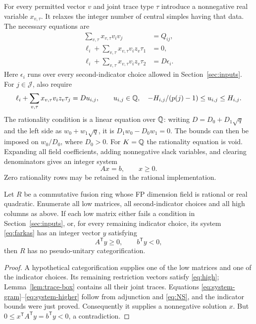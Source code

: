For every permitted vector $v$ and joint trace type $\tau$ introduce a
nonnegative real variable $x_{v,\tau}$. It relaxes the integer number of
central simples having that data. The necessary equations are
\begin{align}
 \sum_{v,\tau}x_{v,\tau}v_iv_j&=Q_{ij},\label{eq:system-gram}\\
 \ell_i+\sum_{v,\tau}x_{v,\tau}v_i z_v\tau_1&=0,
                                                       \label{eq:system-one}\\
 \ell_i+\sum_{v,\tau}x_{v,\tau}v_i z_v\tau_2&=D\epsilon_i.
                                                       \label{eq:system-two}
\end{align}
Here $\epsilon_i$ runs over every second-indicator choice allowed in
Section~\ref{sec:inputs}. For $j\in\mathcal J$, also require
\begin{equation}\label{eq:system-higher}
 \ell_i+\sum_{v,\tau}x_{v,\tau}v_i z_v\tau_j=D u_{i,j},
 \qquad u_{i,j}\in\mathbb Q,\quad
 -H_{i,j}/(p(j)-1)\le u_{i,j}\le H_{i,j}.
\end{equation}
The rationality condition is a linear equation over $\mathbb Q$: writing
$D=D_0+D_1\sqrt q$ and the left side as $w_0+w_1\sqrt q$, it is
$D_1w_0-D_0w_1=0$. The bounds can then be imposed on $w_0/D_0$,
where $D_0>0$. For $K=\mathbb Q$ the rationality equation is void.
Expanding all field coefficients, adding nonnegative slack variables,
and clearing denominators gives an integer system
\begin{equation}\label{eq:farkas}
 A x=b,\qquad x\ge0.
\end{equation}
Zero rationality rows may be retained in the rational implementation.

\begin{theorem}\label{thm:finite}
Let $R$ be a commutative fusion ring whose FP dimension field is rational
or real quadratic. Enumerate all low matrices, all second-indicator
choices and all high columns as above. If each low matrix either fails
a condition in Section~\ref{sec:inputs}, or, for every remaining indicator
choice, its system \eqref{eq:farkas} has an integer vector $y$ satisfying
\begin{equation}\label{eq:dual-ray}
 A^{\mathsf T}y\ge0,\qquad b^{\mathsf T}y<0,
\end{equation}
then $R$ has no pseudo-unitary categorification.
\end{theorem}
\begin{proof}
A hypothetical categorification supplies one of the low matrices and one
of the indicator choices. Its remaining restriction vectors satisfy
\eqref{eq:high}; Lemma~\ref{lem:trace-box} contains all their joint traces.
Equations \eqref{eq:system-gram}--\eqref{eq:system-higher} follow from
adjunction and \eqref{eq:NS}, and the indicator bounds were just proved.
Consequently it supplies a nonnegative solution $x$. But
$0\le x^{\mathsf T}A^{\mathsf T}y=b^{\mathsf T}y<0$, a contradiction.
\end{proof}

